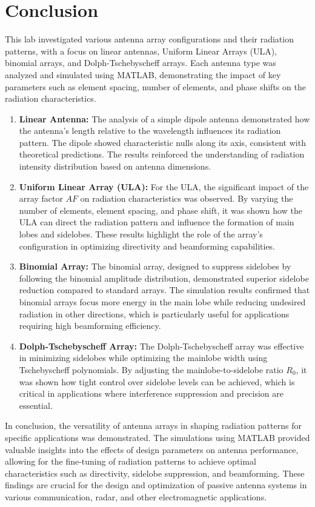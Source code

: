 \documentclass[a4paper, 12pt, english]{article}
\begin{document}
\section{Conclusion}
This lab investigated various antenna array configurations and their radiation patterns, with a focus on linear antennas, Uniform Linear Arrays (ULA), binomial arrays, and Dolph-Tschebyscheff arrays. Each antenna type was analyzed and simulated using MATLAB, demonstrating the impact of key parameters such as element spacing, number of elements, and phase shifts on the radiation characteristics.
\begin{enumerate}
    \item \textbf{Linear Antenna:} The analysis of a simple dipole antenna demonstrated how the antenna's length relative to the wavelength influences its radiation pattern. The dipole showed characteristic nulls along its axis, consistent with theoretical predictions. The results reinforced the understanding of radiation intensity distribution based on antenna dimensions.
    \item \textbf{Uniform Linear Array (ULA):} For the ULA, the significant impact of the array factor $ {AF} $ on radiation characteristics was observed. By varying the number of elements, element spacing, and phase shift, it was shown how the ULA can direct the radiation pattern and influence the formation of main lobes and sidelobes. These results highlight the role of the array's configuration in optimizing directivity and beamforming capabilities.
    \item \textbf{Binomial Array:} The binomial array, designed to suppress sidelobes by following the binomial amplitude distribution, demonstrated superior sidelobe reduction compared to standard arrays. The simulation results confirmed that binomial arrays focus more energy in the main lobe while reducing undesired radiation in other directions, which is particularly useful for applications requiring high beamforming efficiency.
    \item \textbf{Dolph-Tschebyscheff Array:} The Dolph-Tschebyscheff array was effective in minimizing sidelobes while optimizing the mainlobe width using Tschebyscheff polynomials. By adjusting the mainlobe-to-sidelobe ratio $ {{R}_{0}} $, it was shown how tight control over sidelobe levels can be achieved, which is critical in applications where interference suppression and precision are essential.
\end{enumerate}

\noindent
In conclusion, the versatility of antenna arrays in shaping radiation patterns for specific applications was demonstrated. The simulations using MATLAB provided valuable insights into the effects of design parameters on antenna performance, allowing for the fine-tuning of radiation patterns to achieve optimal characteristics such as directivity, sidelobe suppression, and beamforming. These findings are crucial for the design and optimization of passive antenna systems in various communication, radar, and other electromagnetic applications.
\end{document}
